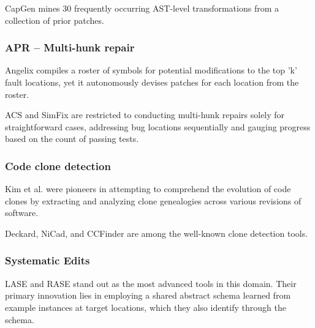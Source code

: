 \documentclass[runningheads]{llncs}
\begin{document}
CapGen mines 30 frequently occurring AST-level transformations from a collection of prior patches.

\subsubsection{APR – Multi-hunk repair\\}
Angelix compiles a roster of symbols for potential modifications to the top 'k' fault locations, yet it autonomously devises patches for each location from the roster.

ACS and SimFix are restricted to conducting multi-hunk repairs solely for straightforward cases, addressing bug locations sequentially and gauging progress based on the count of passing tests.

\subsubsection{Code clone detection\\}
Kim et al. \cite{8_ref_article3} were pioneers in attempting to comprehend the evolution of code clones by extracting and analyzing clone genealogies across various revisions of software.

Deckard, NiCad, and CCFinder are among the well-known clone detection tools.

\subsubsection{Systematic Edits\\} 
LASE and RASE stand out as the most advanced tools in this domain. Their primary innovation lies in employing a shared abstract schema learned from example instances at target locations, which they also identify through the schema.
\end{document}
